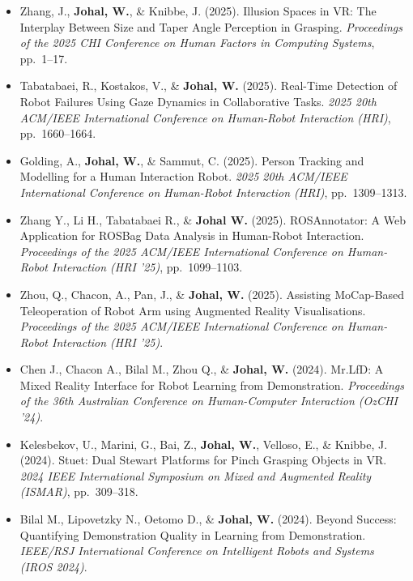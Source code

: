 \begin{itemize}[nosep]
    \item Zhang, J., \textbf{Johal, W.}, \& Knibbe, J. (2025). Illusion Spaces in VR: The Interplay Between Size and Taper Angle Perception in Grasping. \textit{Proceedings of the 2025 CHI Conference on Human Factors in Computing Systems}, pp.\ 1--17.

    \item Tabatabaei, R., Kostakos, V., \& \textbf{Johal, W.} (2025). Real-Time Detection of Robot Failures Using Gaze Dynamics in Collaborative Tasks. \textit{2025 20th ACM/IEEE International Conference on Human-Robot Interaction (HRI)}, pp.\ 1660--1664.

    \item Golding, A., \textbf{Johal, W.}, \& Sammut, C. (2025). Person Tracking and Modelling for a Human Interaction Robot. \textit{2025 20th ACM/IEEE International Conference on Human-Robot Interaction (HRI)}, pp.\ 1309--1313.

    \item Zhang Y., Li H., Tabatabaei R., \& \textbf{Johal W.} (2025). ROSAnnotator: A Web Application for ROSBag Data Analysis in Human-Robot Interaction. \textit{Proceedings of the 2025 ACM/IEEE International Conference on Human-Robot Interaction (HRI '25)}, pp.\ 1099--1103.

    \item Zhou, Q., Chacon, A., Pan, J., \& \textbf{Johal, W.} (2025). Assisting MoCap-Based Teleoperation of Robot Arm using Augmented Reality Visualisations. \textit{Proceedings of the 2025 ACM/IEEE International Conference on Human-Robot Interaction (HRI '25)}.

    \item Chen J., Chacon A., Bilal M., Zhou Q., \& \textbf{Johal, W.} (2024). Mr.LfD: A Mixed Reality Interface for Robot Learning from Demonstration. \textit{Proceedings of the 36th Australian Conference on Human-Computer Interaction (OzCHI '24)}.

    \item Kelesbekov, U., Marini, G., Bai, Z., \textbf{Johal, W.}, Velloso, E., \& Knibbe, J. (2024). Stuet: Dual Stewart Platforms for Pinch Grasping Objects in VR. \textit{2024 IEEE International Symposium on Mixed and Augmented Reality (ISMAR)}, pp.\ 309--318.

    \item Bilal M., Lipovetzky N., Oetomo D., \& \textbf{Johal, W.} (2024). Beyond Success: Quantifying Demonstration Quality in Learning from Demonstration. \textit{IEEE/RSJ International Conference on Intelligent Robots and Systems (IROS 2024)}.


\end{itemize}
